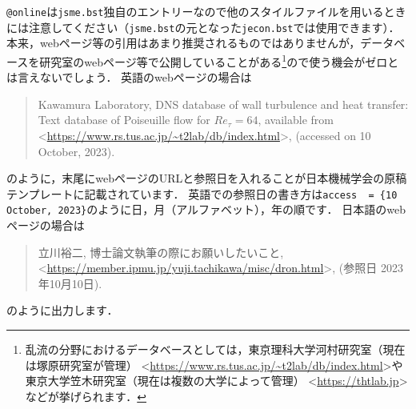 \documentclass[a4paper,fleqn,uplatex,dvipdfmx]{jsarticle}
\newcommand{\jsmefile}{\texttt{jsme.bst}}
\begin{document}
\verb|@online|は\jsmefile 独自のエントリーなので他の\BibTeX{}スタイルファイルを用いるときには注意してください（\jsmefile の元となった\verb|jecon.bst|では使用できます）．
本来，webページ等の引用はあまり推奨されるものではありませんが，データベースを研究室のwebページ等で公開していることがある\footnote{乱流の分野におけるデータベースとしては，東京理科大学河村研究室（現在は塚原研究室が管理） \textless\url{https://www.rs.tus.ac.jp/~t2lab/db/index.html}\textgreater や東京大学笠木研究室（現在は複数の大学によって管理） \textless\url{https://thtlab.jp}\textgreater などが挙げられます．}ので使う機会がゼロとは言えないでしょう．
英語のwebページの場合は
\renewcommand\UrlFont{\rmfamily}
\begin{quote}
    Kawamura Laboratory, DNS database of wall turbulence and heat transfer: Text database of Poiseuille flow for $\mathit{Re}_\tau = 64$, available from \textless\url{https://www.rs.tus.ac.jp/~t2lab/db/index.html}\textgreater, (accessed on 10 October, 2023).
\end{quote}
のように，末尾にwebページのURLと参照日を入れることが日本機械学会の原稿テンプレートに記載されています．
英語での参照日の書き方は\verb|access  = {10 October, 2023}|のように日，月（アルファベット），年の順です．
日本語のwebページの場合は
\begin{quote}
    立川裕二, 博士論文執筆の際にお願いしたいこと, \textless\url{https://member.ipmu.jp/yuji.tachikawa/misc/dron.html}\textgreater, (参照日 2023年10月10日).
\end{quote}
\renewcommand\UrlFont{\ttfamily}
のように出力します．
\end{document}
